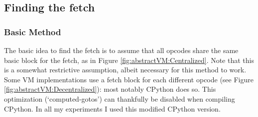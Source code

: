 \documentclass[english]{article}
\begin{document}
 
\subsection{Finding the fetch}

\subsubsection{Basic Method}

The basic idea to find the fetch is to assume that all opcodes share the same basic block for the fetch, as in Figure \ref{fig:abstractVM:Centralized}.
Note that this is a somewhat restrictive assumption, albeit necessary for this method to work. Some VM implementations use a fetch block for each different opcode (see Figure \ref{fig:abstractVM:Decentralized}): most notably CPython does so. This optimization (`computed-gotos') can thankfully be disabled when compiling CPython. In all my experiments I used this modified CPython version.
\end{document}
